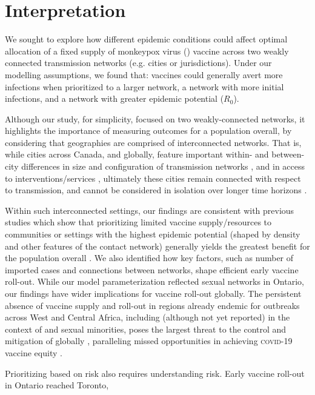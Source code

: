 \section{Interpretation}
We sought to explore how different epidemic conditions
could affect optimal allocation of a fixed supply of monkeypox virus (\MPXV) vaccine
across two weakly connected transmission networks (e.g. cities or jurisdictions).
Under our modelling assumptions, we found that:
vaccines could generally avert more infections when prioritized to
a larger network,
a network with more initial infections, and
a network with greater epidemic potential ($R_0$).
\par
Although our study, for simplicity, focused on two weakly-connected networks,
it highlights the importance of measuring outcomes for a population overall,
by considering that geographies are comprised of interconnected networks.
That is, while cities across Canada, and globally,
feature important within- and between-city differences
in size and configuration of transmission networks \cite{Scott2015,Gesink2018},
and in access to interventions/services \cite{Millett2012,Hart2021,Doran2021},
ultimately these cities remain connected with respect to transmission,
and cannot be considered in isolation over longer time horizons
\cite{Bogoch2015,Gesink2018,Armstrong2020}.
\par
Within such interconnected settings,
our findings are consistent with previous studies which show that
prioritizing limited vaccine supply/resources to communities or settings
with the highest epidemic potential (shaped by density and other features of the contact network)
generally yields the greatest benefit for the population overall
\cite{Garnett2005,Anderson2014,Mishra2021}.
We also identified how key factors,
such as number of imported cases and connections between networks,
shape efficient early vaccine roll-out.
While our model parameterization reflected \GBMSM sexual networks in Ontario,
our findings have wider implications for vaccine roll-out globally.
The persistent absence of vaccine supply and roll-out in
regions already endemic for \MPXV outbreaks across West and Central Africa,
including (although not yet reported) in the context of \GBMSM and sexual minorities,
poses the largest threat to the control and mitigation of \MPXV globally \cite{Zarocostas2022},
paralleling missed opportunities in achieving \textsc{covid-19} vaccine equity \cite{Yamey2022}.
\par
Prioritizing based on risk also requires understanding risk.
Early vaccine roll-out in Ontario reached Toronto,
